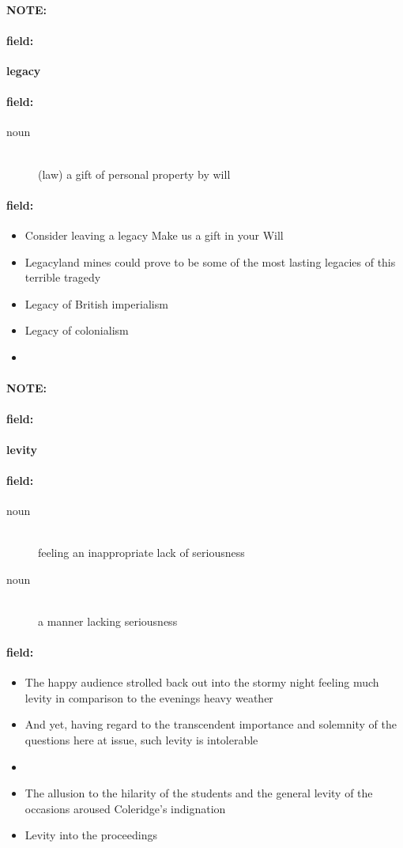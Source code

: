 \documentclass[12pt]{article}
\newenvironment{note}{\paragraph{NOTE:}}{}
\newenvironment{field}{\paragraph{field:}}{}
\begin{document}
\begin{note}
\begin{field}
\textbf{\large legacy}
\end{field}


\begin{field}
\begin{description}
\item[noun] \hfill \\ 
(law) a gift of personal property by will

\end{description}
\end{field}

\begin{field}
\begin{itemize}
\item Consider leaving a legacy Make us a gift in your Will
\item Legacyland mines could prove to be some of the most lasting legacies of this terrible tragedy
\item Legacy of British imperialism
\item Legacy of colonialism
\item 
\end{itemize}
\end{field}
\end{note}
\begin{note}
\begin{field}
\textbf{\large levity}
\end{field}


\begin{field}
\begin{description}
\item[noun] \hfill \\ 
feeling an inappropriate lack of seriousness

\item[noun] \hfill \\ 
a manner lacking seriousness

\end{description}
\end{field}

\begin{field}
\begin{itemize}
\item The happy audience strolled back out into the stormy night feeling much levity in comparison to the evenings heavy weather
\item And yet, having regard to the transcendent importance and solemnity of the questions here at issue, such levity is intolerable
\item 
\item The allusion to the hilarity of the students and the general levity of the occasions aroused Coleridge's indignation
\item Levity into the proceedings
\end{itemize}
\end{field}
\end{note}
\end{document}
